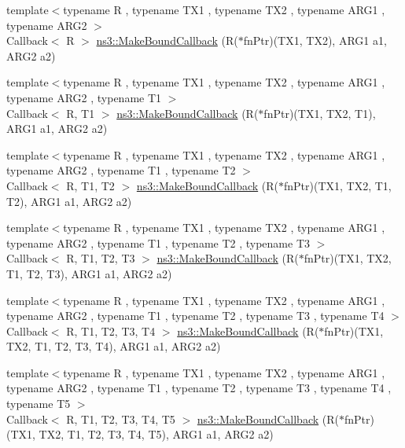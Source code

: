 \begin{DoxyCompactItemize}
\item 
{\footnotesize template$<$typename R , typename T\+X1 , typename T\+X2 , typename A\+R\+G1 , typename A\+R\+G2 $>$ }\\Callback$<$ R $>$ \hyperlink{group__makeboundcallback_ga71b01ed824f2a0f25583232cd4890b30}{ns3\+::\+Make\+Bound\+Callback} (R($\ast$fn\+Ptr)(T\+X1, T\+X2), A\+R\+G1 a1, A\+R\+G2 a2)
\item 
{\footnotesize template$<$typename R , typename T\+X1 , typename T\+X2 , typename A\+R\+G1 , typename A\+R\+G2 , typename T1 $>$ }\\Callback$<$ R, T1 $>$ \hyperlink{group__makeboundcallback_ga59abe422382986b22b912a031c5e2e0c}{ns3\+::\+Make\+Bound\+Callback} (R($\ast$fn\+Ptr)(T\+X1, T\+X2, T1), A\+R\+G1 a1, A\+R\+G2 a2)
\item 
{\footnotesize template$<$typename R , typename T\+X1 , typename T\+X2 , typename A\+R\+G1 , typename A\+R\+G2 , typename T1 , typename T2 $>$ }\\Callback$<$ R, T1, T2 $>$ \hyperlink{group__makeboundcallback_gaedb4e6759a07c368bda833353e56db87}{ns3\+::\+Make\+Bound\+Callback} (R($\ast$fn\+Ptr)(T\+X1, T\+X2, T1, T2), A\+R\+G1 a1, A\+R\+G2 a2)
\item 
{\footnotesize template$<$typename R , typename T\+X1 , typename T\+X2 , typename A\+R\+G1 , typename A\+R\+G2 , typename T1 , typename T2 , typename T3 $>$ }\\Callback$<$ R, T1, T2, T3 $>$ \hyperlink{group__makeboundcallback_gac21d0123c1e6919488e47ba3450b3c73}{ns3\+::\+Make\+Bound\+Callback} (R($\ast$fn\+Ptr)(T\+X1, T\+X2, T1, T2, T3), A\+R\+G1 a1, A\+R\+G2 a2)
\item 
{\footnotesize template$<$typename R , typename T\+X1 , typename T\+X2 , typename A\+R\+G1 , typename A\+R\+G2 , typename T1 , typename T2 , typename T3 , typename T4 $>$ }\\Callback$<$ R, T1, T2, T3, T4 $>$ \hyperlink{group__makeboundcallback_gab9d7cf4043dcf356ea398809d8a66691}{ns3\+::\+Make\+Bound\+Callback} (R($\ast$fn\+Ptr)(T\+X1, T\+X2, T1, T2, T3, T4), A\+R\+G1 a1, A\+R\+G2 a2)
\item 
{\footnotesize template$<$typename R , typename T\+X1 , typename T\+X2 , typename A\+R\+G1 , typename A\+R\+G2 , typename T1 , typename T2 , typename T3 , typename T4 , typename T5 $>$ }\\Callback$<$ R, T1, T2, T3, T4, T5 $>$ \hyperlink{group__makeboundcallback_gafc9056c250c32227b83f9e5de630bb4e}{ns3\+::\+Make\+Bound\+Callback} (R($\ast$fn\+Ptr)(T\+X1, T\+X2, T1, T2, T3, T4, T5), A\+R\+G1 a1, A\+R\+G2 a2)

\end{DoxyCompactItemize}
